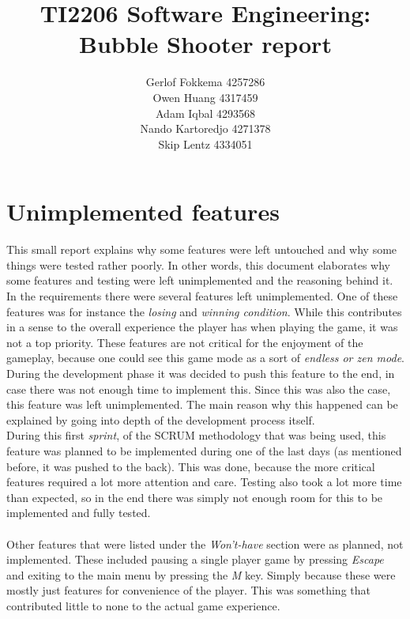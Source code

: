 \documentclass[a4paper,11pt]{article}
\title{TI2206 Software Engineering: Bubble Shooter report}
\author{Gerlof Fokkema 4257286 \\
	Owen Huang 4317459 \\
	Adam Iqbal 4293568 \\
	Nando Kartoredjo 4271378 \\
	Skip Lentz 4334051 \\
}
\begin{document}
\maketitle

\newpage
\section*{Unimplemented features}
This small report explains why some features were left untouched and why some things were tested rather poorly. In other words, this document elaborates why some features and testing were left unimplemented and the reasoning behind it. \\
\noindent
In the requirements there were several features left unimplemented. One of these features was for instance the \textit{losing} and \textit{winning condition}.
While this contributes in a sense to the overall experience the player has when playing the game, it was not a top priority. These features are not critical for the enjoyment of the gameplay, because one could see this game mode as a sort of \textit{endless or zen mode}. During the development phase it was decided to push this feature to the end, in case there was not enough time to implement this. Since this was also the case, this feature was left unimplemented. The main reason why this happened can be explained by going into depth of the development process itself. \\
\indent During this first \textit{sprint}, of the SCRUM methodology that was being used, this feature was planned to be implemented during one of the last days (as mentioned before, it was pushed to the back). This was done, because the more critical features required a lot more attention and care. Testing also took a lot more time than expected, so in the end there was simply not enough room for this to be implemented and fully tested. \\\\
\noindent
Other features that were listed under the \textit{Won't-have} section were as planned, not implemented. These included pausing a single player game by pressing \textit{Escape} and exiting to the main menu by pressing the \textit{M} key.  Simply because these were mostly just features for convenience of the player. This was something that contributed little to none to the actual game experience.
\end{document}
